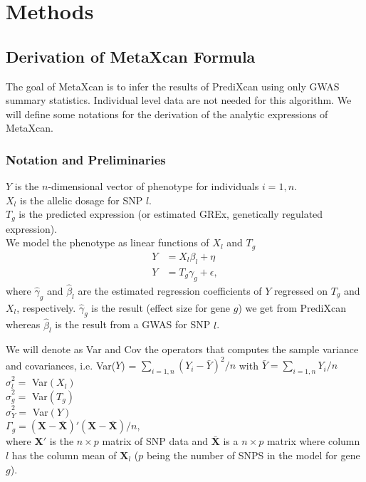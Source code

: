 \documentclass[10pt]{article}
\begin{document}
\section*{Methods}

\subsection*{Derivation of MetaXcan Formula}

The goal of MetaXcan is to infer the results of PrediXcan using only GWAS summary statistics. Individual level data are not needed for this algorithm. We will define some notations for the derivation of the analytic expressions of MetaXcan.

\subsubsection*{Notation and Preliminaries}

$Y$ is the $n$-dimensional vector of phenotype for individuals $i=1,n$.\\
$X_l$ is the allelic dosage for SNP $l$.\\
$T_g$ is the predicted expression (or estimated GREx, genetically regulated expression).\\
We model the phenotype as linear functions of $X_l$ and $T_g$
\begin{align*}
Y &= X_l \beta_l + \eta\\
Y &= T_g \gamma_g + \epsilon,
\end{align*}
where $\hat\gamma_g$ and $\hat\beta_l$ are the estimated regression coefficients of $Y$ regressed on $T_g$ and $X_l$, respectively. $\hat\gamma_g$ is the result (effect size for gene $g$) we get from PrediXcan whereas $\hat\beta_l$ is the result from a GWAS for SNP $l$.

We will denote as Var and Cov the operators that computes the sample variance and covariances, i.e. Var($Y$) = $\sum_{i=1,n} (Y_i - \bar{Y})^2/n$ with $\bar{Y} = \sum_{i=1,n} Y_i / n$\\
$\hat\sigma^2_l = $  Var$(X_l)$\\
$\hat\sigma^2_g = $  Var$(T_g)$\\
$\hat\sigma^2_Y = $  Var$(Y)$\\
$\Gamma_g = \mathbf{(X-\bar{X})'(X-\bar{X})}/n$,\\ 
 where  $\mathbf{X'}$ is the $n \times p$ matrix of SNP data and $\mathbf{\bar{X}}$ is a $n \times p$ matrix where column $l$ has the column mean of $\mathbf{X}_l$ ($p$ being the number of SNPS in the  model for gene $g$).\\
%
%
\end{document}
